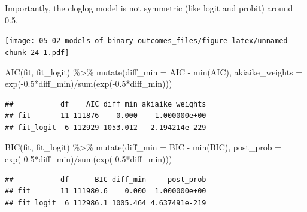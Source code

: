 \documentclass[
]{book}
\newenvironment{Shaded}{\begin{snugshade}}{\end{snugshade}}
\newcommand{\AttributeTok}[1]{\textcolor[rgb]{0.77,0.63,0.00}{#1}}
\newcommand{\FloatTok}[1]{\textcolor[rgb]{0.00,0.00,0.81}{#1}}
\newcommand{\FunctionTok}[1]{\textcolor[rgb]{0.00,0.00,0.00}{#1}}
\newcommand{\NormalTok}[1]{#1}
\newcommand{\SpecialCharTok}[1]{\textcolor[rgb]{0.00,0.00,0.00}{#1}}
\begin{document}
Importantly, the cloglog model is not symmetric (like logit and probit) around 0.5.

\texttt{[image: 05-02-models-of-binary-outcomes\_files/figure-latex/unnamed-chunk-24-1.pdf]}

\begin{Shaded}
\begin{Highlighting}[]
\FunctionTok{AIC}\NormalTok{(fit, fit\_logit) }\SpecialCharTok{\%\textgreater{}\%}
  \FunctionTok{mutate}\NormalTok{(}\AttributeTok{diff\_min =}\NormalTok{ AIC }\SpecialCharTok{{-}} \FunctionTok{min}\NormalTok{(AIC),}
         \AttributeTok{akiaike\_weights =} \FunctionTok{exp}\NormalTok{(}\SpecialCharTok{{-}}\FloatTok{0.5}\SpecialCharTok{*}\NormalTok{diff\_min)}\SpecialCharTok{/}\FunctionTok{sum}\NormalTok{(}\FunctionTok{exp}\NormalTok{(}\SpecialCharTok{{-}}\FloatTok{0.5}\SpecialCharTok{*}\NormalTok{diff\_min)))}
\end{Highlighting}
\end{Shaded}

\begin{verbatim}
##           df    AIC diff_min akiaike_weights
## fit       11 111876    0.000    1.000000e+00
## fit_logit  6 112929 1053.012   2.194214e-229
\end{verbatim}

\begin{Shaded}
\begin{Highlighting}[]
\FunctionTok{BIC}\NormalTok{(fit, fit\_logit) }\SpecialCharTok{\%\textgreater{}\%}
  \FunctionTok{mutate}\NormalTok{(}\AttributeTok{diff\_min =}\NormalTok{ BIC }\SpecialCharTok{{-}} \FunctionTok{min}\NormalTok{(BIC),}
         \AttributeTok{post\_prob =} \FunctionTok{exp}\NormalTok{(}\SpecialCharTok{{-}}\FloatTok{0.5}\SpecialCharTok{*}\NormalTok{diff\_min)}\SpecialCharTok{/}\FunctionTok{sum}\NormalTok{(}\FunctionTok{exp}\NormalTok{(}\SpecialCharTok{{-}}\FloatTok{0.5}\SpecialCharTok{*}\NormalTok{diff\_min)))}
\end{Highlighting}
\end{Shaded}

\begin{verbatim}
##           df      BIC diff_min     post_prob
## fit       11 111980.6    0.000  1.000000e+00
## fit_logit  6 112986.1 1005.464 4.637491e-219
\end{verbatim}
\end{document}
